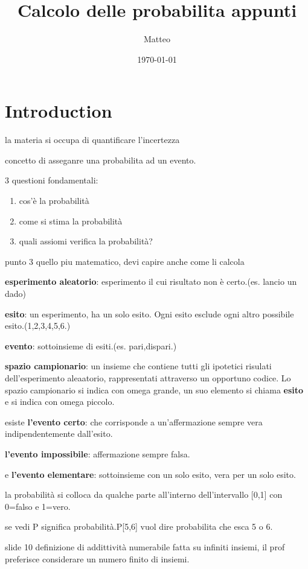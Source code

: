 \documentclass[12pt]{article}
\title{Calcolo delle probabilita appunti}
\author{Matteo}
\date{\today}
\begin{document}
\maketitle

\section{Introduction}

la materia si occupa di quantificare l'incertezza

concetto di asseganre una probabilita ad un evento.

3 questioni fondamentali:
\begin{enumerate}
    \item cos'è la probabilità
    \item come si stima la probabilità
    \item quali assiomi verifica la probabilità?
\end{enumerate}

punto 3 quello piu matematico, devi capire anche come li calcola

\textbf{esperimento aleatorio}: esperimento il cui risultato non è certo.(es. lancio un dado)

\textbf{esito}: un esperimento, ha un solo esito. Ogni esito esclude ogni altro possibile esito.(1,2,3,4,5,6.)

\textbf{evento}: sottoinsieme di esiti.(es. pari,dispari.)

\textbf{spazio campionario}: un insieme che contiene tutti gli ipotetici risulati dell'esperimento aleaatorio, rappresentati attraverso un opportuno codice. Lo spazio campionario si indica con omega grande, un suo elemento si chiama \textbf{esito} e si indica con omega piccolo.

esiste \textbf{l'evento certo}: che corrisponde a un'affermazione sempre vera indipendentemente dall'esito.

\textbf{l'evento impossibile}: affermazione sempre falsa.

e \textbf{l'evento elementare}: sottoinsieme con un solo esito, vera per un solo esito.


la probabilità si colloca da qualche parte all'interno dell'intervallo [0,1] con 0=falso e 1=vero.

se vedi P significa probabilità.P[5,6] vuol dire probabilita che esca 5 o 6.

slide 10 definizione di addittività numerabile fatta su infiniti insiemi, il prof preferisce considerare un numero finito di insiemi.
\end{document}
